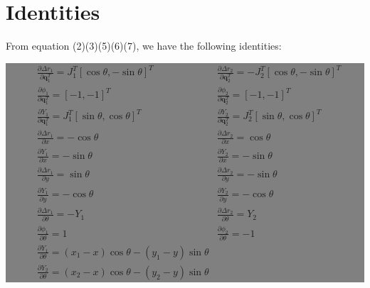 \documentclass[]{article}
\begin{document}
\section{Identities}
\label{sec::app1}
From equation (2)(3)(5)(6)(7), we have the following identities:

\colorbox{gray}{
\begin{minipage}{10cm}
 \begin{align*}
 &\frac{\partial \Delta r_1}{\partial \mathbf{q}_1^T}=J_{1}^T\left[\cos\theta,-\sin\theta\right]^T 
 &\frac{\partial \Delta r_2}{\partial \mathbf{q}_2^T}=-J_{2}^T\left[\cos\theta,-\sin\theta\right]^T\nonumber\\
 &\frac{\partial \phi_1}{\partial \mathbf{q}_1^T}=[-1,-1]^T
 &\frac{\partial \phi_2}{\partial \mathbf{q}_2^T}=[-1,-1]^T\nonumber\\
 &\frac{\partial Y_1}{\partial\mathbf{q}_1^T}=J_1^T[\sin\theta,\cos\theta]^T
 &\frac{\partial Y_2}{\partial \mathbf{q}_2^T}=J_2^T[\sin\theta,\cos\theta]^T\nonumber\\
 &\frac{\partial \Delta r_1}{\partial x}=-\cos\theta
 &\frac{\partial \Delta r_2}{\partial x}=\cos\theta \nonumber\\
 &\frac{\partial Y_1}{\partial x}=-\sin\theta 
 &\frac{\partial Y_2}{\partial x}=-\sin\theta \nonumber\\
 &\frac{\partial \Delta r_1}{\partial y}=\sin\theta&\frac{\partial \Delta r_2}{\partial y}=-\sin\theta \nonumber\\
  &\frac{\partial Y_1}{\partial y}=-\cos\theta &\frac{\partial Y_2}{\partial y}=-\cos\theta \nonumber\\
  &\frac{\partial \Delta r_1}{\partial \theta}=-Y_1&\frac{\partial \Delta r_2}{\partial \theta}=Y_2\nonumber\\
  &\frac{\partial \phi_1}{\partial \theta}=1&\frac{\partial \phi_2}{\partial \theta}=-1\nonumber\\
  &\frac{\partial Y_1}{\partial \theta}=(x_1-x)\cos\theta-(y_1-y)\sin\theta&\\
  &\frac{\partial Y_2}{\partial \theta}=(x_2-x)\cos\theta-(y_2-y)\sin\theta&\nonumber
 \end{align*}
\end{minipage}}
\end{document}
